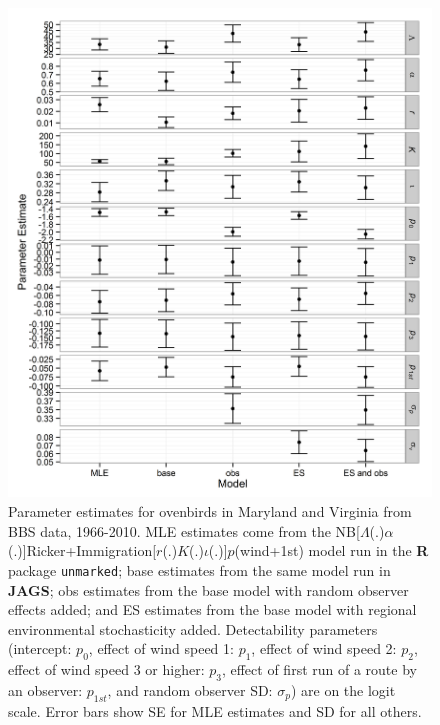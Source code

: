 \documentclass{article}
\begin{document}
\clearpage
\begin{figure}
  \centering
  \includegraphics[width=6.5in]{../figs/oven_par_est}
\caption{Parameter estimates for ovenbirds in Maryland and Virginia from BBS data, 1966-2010.  
MLE estimates come from the NB[$\Lambda$(.)$\alpha$(.)]Ricker+Immigration[$r$(.)$K$(.)$\iota$(.)]$p$(wind+1st) 
model run in the \textbf{R} package \texttt{unmarked}; base estimates from the same model run in \textbf{JAGS};
obs estimates from the base model with random observer effects added; and ES estimates from the base
model with regional environmental stochasticity added.  Detectability parameters (intercept: $p_{0}$, 
effect of wind speed 1: $p_{1}$, effect of wind speed 2: $p_{2}$, effect of wind speed 3 or higher: $p_{3}$, 
effect of first run of a route by an observer: $p_{1st}$, and random observer SD: $\sigma_{p}$) are on the 
logit scale. Error bars show SE for MLE estimates and SD for all others.}
\label{fig:oven_par_est}
\end{figure}
\end{document}

